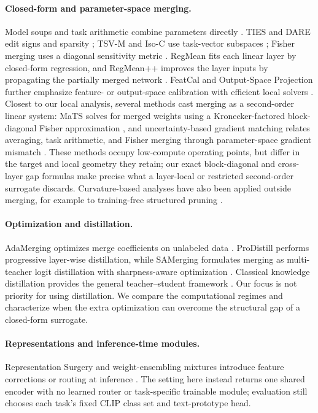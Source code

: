 \documentclass[letterpaper]{article} %
\theoremstyle{plain}
\theoremstyle{definition}
\begin{document}
\paragraph{Closed-form and parameter-space merging.}
Model soups and task arithmetic combine parameters directly \citep{wortsman2022modelsoups,ilharco2023taskarithmetic}.
TIES and DARE edit signs and sparsity \citep{yadav2023ties,yu2024dare}; TSV-M and Iso-C use task-vector subspaces \citep{gargiulo2025tsvm,marczak2025isotropic}; Fisher merging uses a diagonal sensitivity metric \citep{matena2022fisher}.
RegMean fits each linear layer by closed-form regression, and RegMean++ improves the layer inputs by propagating the partially merged network \citep{jin2023regmean,regmeanplusplus2025}.
FeatCal and Output-Space Projection further emphasize feature- or output-space calibration with efficient local solvers \citep{featcal2026,outputprojection2026}.
Closest to our local analysis, several methods cast merging as a second-order linear system: MaTS solves for merged weights using a Kronecker-factored block-diagonal Fisher approximation \citep{tam2024mats}, and uncertainty-based gradient matching relates averaging, task arithmetic, and Fisher merging through parameter-space gradient mismatch \citep{daheim2024uncertainty}.
These methods occupy low-compute operating points, but differ in the target and local geometry they retain; our exact block-diagonal and cross-layer gap formulas make precise what a layer-local or restricted second-order surrogate discards.
Curvature-based analyses have also been applied outside merging, for example to training-free structured pruning \citep{gong2026cocurve}.

\paragraph{Optimization and distillation.}
AdaMerging optimizes merge coefficients on unlabeled data \citep{yang2024adamerging}.
ProDistill performs progressive layer-wise distillation, while SAMerging formulates merging as multi-teacher logit distillation with sharpness-aware optimization \citep{prodistill2025,samerging2025}.
Classical knowledge distillation provides the general teacher--student framework \citep{hinton2015distilling}.
Our focus is not priority for using distillation.
We compare the computational regimes and characterize when the extra optimization can overcome the structural gap of a closed-form surrogate.

\paragraph{Representations and inference-time modules.}
Representation Surgery and weight-ensembling mixtures introduce feature corrections or routing at inference \citep{yang2024surgery,tang2024wemoe}.
The setting here instead returns one shared encoder with no learned router or task-specific trainable module; evaluation still chooses each task's fixed CLIP class set and text-prototype head.
\end{document}
